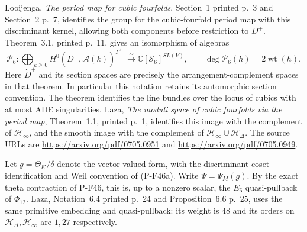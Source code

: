 \documentclass[11pt,a4paper]{article}
\begin{document}
Looijenga, \emph{The period map for cubic fourfolds}, Section~1
printed p.~3 and Section~2 p.~7, identifies the group for the
cubic-fourfold period map with this discriminant kernel, allowing
both components before restriction to $D^+$. Theorem~3.1,
printed p.~11, gives an isomorphism of algebras
\[
 \mathcal P_6:\bigoplus_{k\ge0}
 H^0(\dot D^+,\mathcal A(k))^{\Gamma^+}
       \ \xrightarrow{\ \sim\ }
 \mathbb C[\mathscr S_6]^{SL(V)},
 \qquad \deg\mathcal P_6(h)=2\operatorname{wt}(h).
 \tag{P-F55a}
\]
Here $\dot D^+$ and its section spaces are precisely the
arrangement-complement spaces in that theorem. In particular this
notation retains its automorphic section convention. The theorem
identifies the line bundles over the locus of cubics with at most
ADE singularities. Laza, \emph{The moduli space of cubic fourfolds
via the period map}, Theorem~1.1, printed p.~1, identifies this
image with the complement of $\mathcal H_\infty$, and the smooth
image with the complement of
$\mathcal H_\infty\cup\mathcal H_\Delta$.
The source URLs are
\url{https://arxiv.org/pdf/0705.0951} and
\url{https://arxiv.org/pdf/0705.0949}.

Let $g=\Theta_K/\delta$ denote the vector-valued form, with the
discriminant-coset identification and Weil convention of (P-F46a).
Write $\Psi=\Psi_M(g)$. By the exact theta contraction of P-F46,
this is, up to a nonzero scalar, the $E_6$ quasi-pullback of
$\Phi_{12}$. Laza, Notation~6.4 printed p.~24 and
Proposition~6.6 p.~25, uses the same primitive embedding and
quasi-pullback: its weight is $48$ and its orders on
$\mathcal H_\Delta,\mathcal H_\infty$ are $1,27$ respectively.
\end{document}
